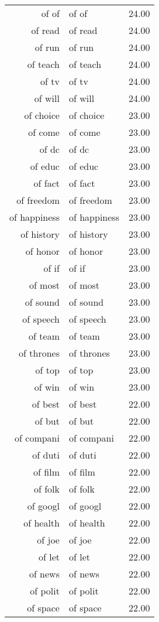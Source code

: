 \begin{table}[ht]
\begin{tabular}{rlr}
  of of & of of & 24.00 \\ 
  of read & of read & 24.00 \\ 
  of run & of run & 24.00 \\ 
  of teach & of teach & 24.00 \\ 
  of tv & of tv & 24.00 \\ 
  of will & of will & 24.00 \\ 
  of choice & of choice & 23.00 \\ 
  of come & of come & 23.00 \\ 
  of dc & of dc & 23.00 \\ 
  of educ & of educ & 23.00 \\ 
  of fact & of fact & 23.00 \\ 
  of freedom & of freedom & 23.00 \\ 
  of happiness & of happiness & 23.00 \\ 
  of history & of history & 23.00 \\ 
  of honor & of honor & 23.00 \\ 
  of if & of if & 23.00 \\ 
  of most & of most & 23.00 \\ 
  of sound & of sound & 23.00 \\ 
  of speech & of speech & 23.00 \\ 
  of team & of team & 23.00 \\ 
  of thrones & of thrones & 23.00 \\ 
  of top & of top & 23.00 \\ 
  of win & of win & 23.00 \\ 
  of best & of best & 22.00 \\ 
  of but & of but & 22.00 \\ 
  of compani & of compani & 22.00 \\ 
  of duti & of duti & 22.00 \\ 
  of film & of film & 22.00 \\ 
  of folk & of folk & 22.00 \\ 
  of googl & of googl & 22.00 \\ 
  of health & of health & 22.00 \\ 
  of joe & of joe & 22.00 \\ 
  of let & of let & 22.00 \\ 
  of news & of news & 22.00 \\ 
  of polit & of polit & 22.00 \\ 
  of space & of space & 22.00 \\ 

\end{tabular}
\end{table}

